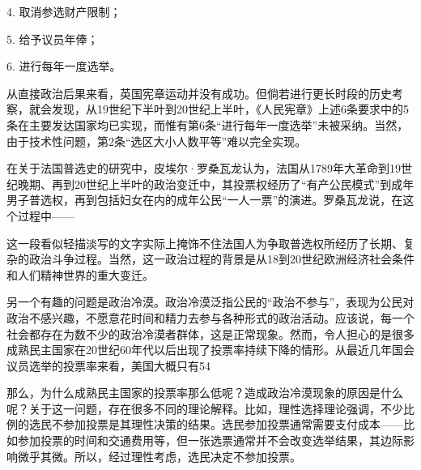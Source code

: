 {{4. 取消参选财产限制；

5. 给予议员年俸；

6. 进行每年一度选举。}

从直接政治后果来看，英国宪章运动并没有成功。但倘若进行更长时段的历史考察，就会发现，从19世纪下半叶到20世纪上半叶，《人民宪章》上述6条要求中的5条在主要发达国家均已实现，而惟有第6条“进行每年一度选举”未被采纳。当然，由于技术性问题，第2条“选区大小人数平等”难以完全实现。

在关于法国普选史的研究中，皮埃尔·罗桑瓦龙认为，法国从1789年大革命到19世纪晚期、再到20世纪上半叶的政治变迁中，其投票权经历了“有产公民模式”到成年男子普选权，再到包括妇女在内的成年公民“一人一票”的演进。罗桑瓦龙说，在这个过程中——


这一段看似轻描淡写的文字实际上掩饰不住法国人为争取普选权所经历了长期、复杂的政治斗争过程。当然，这一政治过程的背景是从18到20世纪欧洲经济社会条件和人们精神世界的重大变迁。


另一个有趣的问题是政治冷漠。政治冷漠泛指公民的“政治不参与”，表现为公民对政治不感兴趣，不愿意花时间和精力去参与各种形式的政治活动。应该说，每一个社会都存在为数不少的政治冷漠者群体，这是正常现象。然而，令人担心的是很多成熟民主国家在20世纪60年代以后出现了投票率持续下降的情形。从最近几年国会议员选举的投票率来看，美国大概只有54%

那么，为什么成熟民主国家的投票率那么低呢？造成政治冷漠现象的原因是什么呢？关于这一问题，存在很多不同的理论解释。比如，理性选择理论强调，不少比例的选民不参加投票是其理性决策的结果。选民参加投票通常需要支付成本——比如参加投票的时间和交通费用等，但一张选票通常并不会改变选举结果，其边际影响微乎其微。所以，经过理性考虑，选民决定不参加投票。

}
